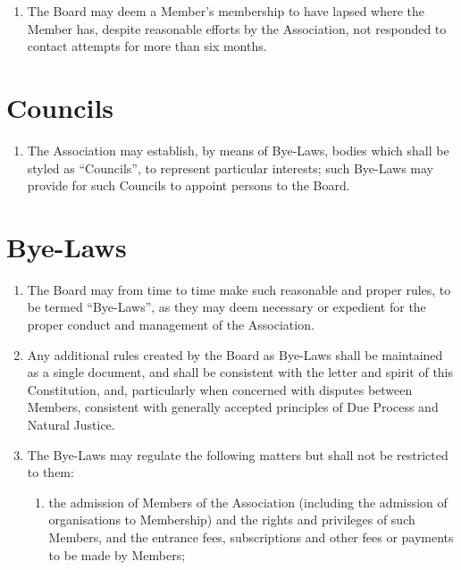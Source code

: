 \documentclass[10pt]{mk-articles-of-association}
\newcommand{\mysection}[1]{
  \end{enumerate}
  \section*{#1}
  \begin{enumerate}[resume]
}
\newcommand{\EC}[0]{Board}
\newcommand{\Exec}[0]{\EC{} }
\begin{document}
\begin{enumerate}
\begin{enumerate}

\item the Member has been given at least twenty-one clear days' notice in
  writing of the meeting of the \Exec at which the resolution will
  be proposed and the reasons why it is to be proposed,

\item the Member or, at the option of the Member, the Member's
  representative (who need not be a Member of the Association) has been
  allowed to make representations to the meeting.

\end{enumerate}

\item The \Exec may deem a Member's membership to have lapsed where
  the Member has, despite reasonable efforts by the Association, not
  responded to contact attempts for more than six months.
  \label{lapse}


\mysection{Councils}

\item The Association may establish, by means of Bye-Laws, bodies which
  shall be styled as ``Councils'', to represent particular interests;
  such Bye-Laws may provide for such Councils to appoint persons to
  the \EC{}.\label{councils}



\mysection{Bye-Laws}

\item The \Exec may from time to time make such reasonable and proper
  rules, to be termed ``Bye-Laws'', as they may deem necessary or
  expedient for the proper conduct and management of the Association.

\item Any additional rules created by the \Exec as Bye-Laws
  shall be maintained as a single document, and shall be
  consistent with the letter and spirit of this Constitution, and,
  particularly when concerned with disputes between Members,
  consistent with generally accepted principles of Due Process and
  Natural Justice.

\item The Bye-Laws may regulate the following matters but shall not be
  restricted to them:

\begin{enumerate}

\item the admission of Members of the Association (including the admission
  of organisations to Membership) and the rights and privileges of
  such Members, and the entrance fees, subscriptions and other fees or
  payments to be made by Members;


\end{enumerate}
\end{enumerate}
\end{document}
